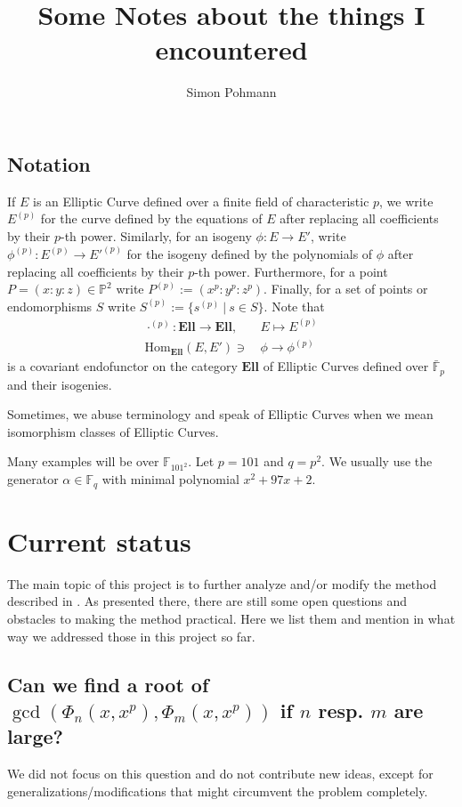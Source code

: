 \documentclass{scrartcl}
\title{Some Notes about the things I encountered}
\author{Simon Pohmann}
\newcommand{\F}{\mathbb{F}}
\theoremstyle{definition}
\begin{document}
\maketitle

\subsection*{Notation}
If $E$ is an Elliptic Curve defined over a finite field of characteristic $p$, we write $E^{(p)}$ for the curve defined by the equations of $E$ after replacing all coefficients by their $p$-th power.
Similarly, for an isogeny $\phi: E \to E'$, write $\phi^{(p)}: E^{(p)} \to E'^{(p)}$ for the isogeny defined by the polynomials of $\phi$ after replacing all coefficients by their $p$-th power.
Furthermore, for a point $P = (x : y : z) \in \mathbb{P}^2$ write $P^{(p)} := (x^p : y^p : z^p)$.
Finally, for a set of points or endomorphisms $S$ write $S^{(p)} := \{ s^{(p)} \ | \ s \in S \}$.
Note that
\begin{align*}
    \cdot^{(p)}: \mathrm{\textbf{Ell}} \to \mathrm{\textbf{Ell}}, \quad &E \mapsto E^{(p)} \\
    \mathrm{Hom}_{\mathrm{\textbf{Ell}}}(E, E') \ni &\phi \to \phi^{(p)}
\end{align*}
is a covariant endofunctor on the category $\mathrm{\textbf{Ell}}$ of Elliptic Curves defined over $\bar{\F}_p$ and their isogenies.

Sometimes, we abuse terminology and speak of Elliptic Curves when we mean isomorphism classes of Elliptic Curves.

Many examples will be over $\F_{101^2}$.
Let $p = 101$ and $q = p^2$.
We usually use the generator $\alpha \in \F_q$ with minimal polynomial $x^2 + 97 x + 2$.

\section{Current status}
The main topic of this project is to further analyze and/or modify the method described in \cite[Chapter 3]{base_paper}.
As presented there, there are still some open questions and obstacles to making the method practical.
Here we list them and mention in what way we addressed those in this project so far.

\subsection*{Can we find a root of $\gcd(\Phi_n(x, x^p), \Phi_m(x, x^p))$ if $n$ resp. $m$ are large?}
We did not focus on this question and do not contribute new ideas, except for generalizations/modifications that might circumvent the problem completely.
\end{document}

